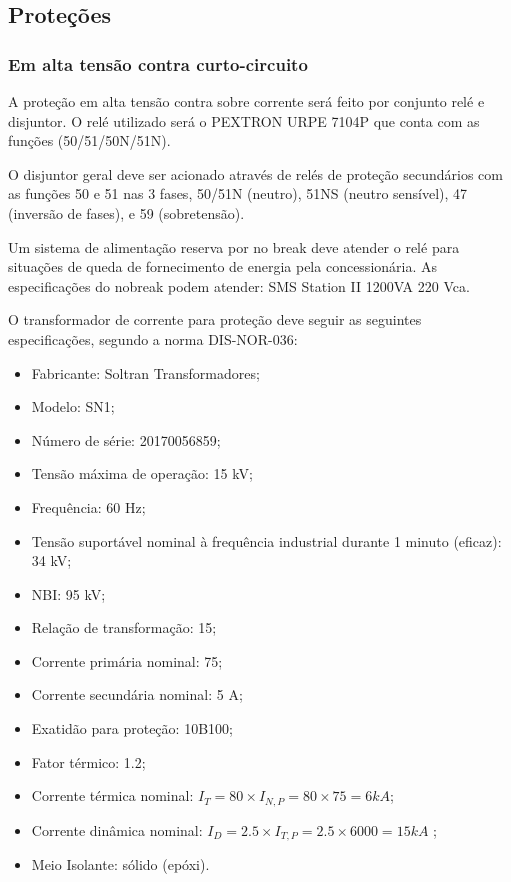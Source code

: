 \subsection{Proteções}

\subsubsection{Em alta tensão contra curto-circuito}


A proteção em alta tensão contra sobre corrente será feito por conjunto relé e disjuntor. O relé utilizado será o PEXTRON URPE 7104P que conta com as funções (50/51/50N/51N).

O disjuntor geral deve ser acionado através de relés de proteção secundários com as funções 50 e 51 nas 3 fases, 50/51N (neutro), 51NS (neutro sensível), 47 (inversão de fases), e 59 (sobretensão).


Um sistema de alimentação reserva por no break deve atender o relé para situações de queda de fornecimento de energia pela concessionária. As especificações do nobreak podem atender: SMS Station II 1200VA 220 Vca.

O transformador de corrente para proteção deve seguir as seguintes especificações, segundo a norma DIS-NOR-036:

\begin{itemize}
    \item Fabricante: Soltran Transformadores;
    \item Modelo: SN1;
    \item Número de série: 20170056859;
    \item Tensão máxima de operação: 15 kV;
    \item Frequência: 60 Hz;
    \item Tensão suportável nominal à frequência industrial durante 1 minuto (eficaz): 34 kV;
    \item NBI: 95 kV;
    \item Relação de transformação: 15;
    \item Corrente primária nominal: 75;
    \item Corrente secundária nominal: 5 A;
    \item Exatidão para proteção: 10B100;
    \item Fator térmico: 1.2;
    \item Corrente térmica nominal: $I_T = 80 \times I_{N,P} = 80 \times 75 = 6kA$;
    \item Corrente dinâmica nominal: $I_D = 2.5 \times I_{T,P} = 2.5 \times 6000 = 15kA$ ;
    \item Meio Isolante: sólido (epóxi).
\end{itemize}

